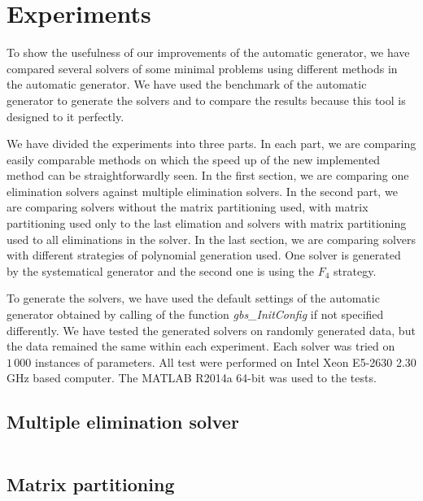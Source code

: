 \chapter{Experiments}
To show the usefulness of our improvements of the automatic generator, we have compared several solvers of some minimal problems using different methods in the automatic generator. We have used the benchmark of the automatic generator to generate the solvers and to compare the results because this tool is designed to it perfectly.

We have divided the experiments into three parts. In each part, we are comparing easily comparable methods on which the speed up of the new implemented method can be straightforwardly seen. In the first section, we are comparing one elimination solvers against multiple elimination solvers. In the second part, we are comparing solvers without the matrix partitioning used, with matrix partitioning used only to the last elimation and solvers with matrix partitioning used to all eliminations in the solver. In the last section, we are comparing solvers with different strategies of polynomial generation used. One solver is generated by the systematical generator and the second one is using the $F_4$ strategy.

To generate the solvers, we have used the default settings of the automatic generator obtained by calling of the function \textit{gbs\_InitConfig} if not specified differently. We have tested the generated solvers on randomly generated data, but the data remained the same within each experiment. Each solver was tried on $1\,000$ instances of parameters. All test were performed on Intel Xeon E5-2630 2.30 GHz based computer. The MATLAB R2014a 64-bit was used to the tests.

\section{Multiple elimination solver}
\begin{figure}[ht]
  \centering
  \resizebox{0.9\textwidth}{!}{}
\end{figure}

\begin{table}[ht]
  \centering
  \begin{tabular}{|c||ccc|}
    \hline
    
    \hline
  \end{tabular}
\end{table}

\section{Matrix partitioning}
\begin{figure}[ht]
  \centering
  \resizebox{0.9\textwidth}{!}{}
\end{figure}

